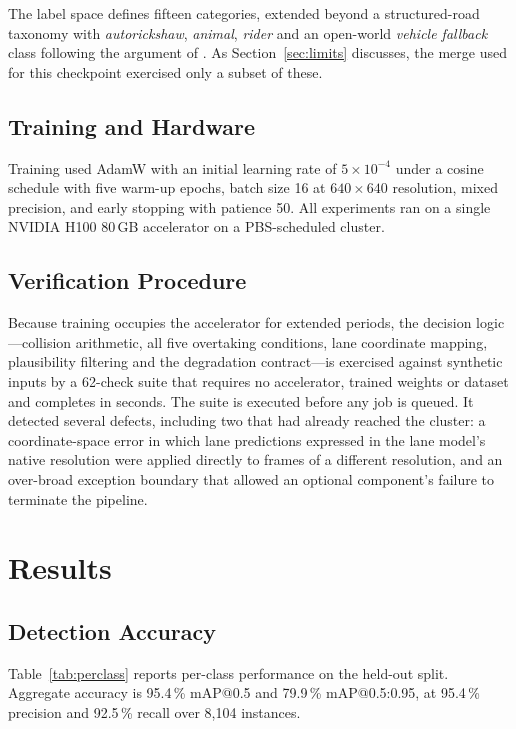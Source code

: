 \documentclass[conference]{IEEEtran}
\begin{document}
The label space defines fifteen categories, extended beyond a
structured-road taxonomy with \textit{autorickshaw}, \textit{animal},
\textit{rider} and an open-world \textit{vehicle fallback} class following the
argument of \cite{varma2019idd}. As Section~\ref{sec:limits} discusses, the
merge used for this checkpoint exercised only a subset of these.

\subsection{Training and Hardware}

Training used AdamW with an initial learning rate of $5\times10^{-4}$ under a
cosine schedule with five warm-up epochs, batch size 16 at $640\times640$
resolution, mixed precision, and early stopping with patience 50. All experiments
ran on a single NVIDIA H100 80\,GB accelerator on a PBS-scheduled cluster.

\subsection{Verification Procedure}

Because training occupies the accelerator for extended periods, the decision
logic---collision arithmetic, all five overtaking conditions, lane coordinate
mapping, plausibility filtering and the degradation contract---is exercised
against synthetic inputs by a 62-check suite that requires no accelerator,
trained weights or dataset and completes in seconds. The suite is executed
before any job is queued. It detected several defects, including two that had
already reached the cluster: a coordinate-space error in which lane predictions
expressed in the lane model's native resolution were applied directly to frames
of a different resolution, and an over-broad exception boundary that allowed an
optional component's failure to terminate the pipeline.

\section{Results}

\subsection{Detection Accuracy}

Table~\ref{tab:perclass} reports per-class performance on the held-out split.
Aggregate accuracy is 95.4\,\% mAP@0.5 and 79.9\,\% mAP@0.5:0.95, at 95.4\,\%
precision and 92.5\,\% recall over 8{,}104 instances.
\end{document}
